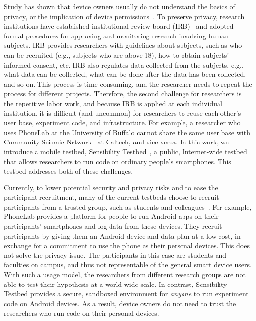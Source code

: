 Study has shown that device owners usually do not understand the 
basics of privacy, or the implication of device 
permissions~\cite{camp2015respecting}. 
To preserve privacy, research institutions have established 
institutional review board (IRB)~\cite{irb} and adopted formal 
procedures for approving and monitoring research involving 
human subjects. IRB provides researchers with guidelines about 
subjects, such as who can be recruited (e.g., subjects
who are above 18), 
how to obtain subjects' informed consent, etc. IRB also 
regulates data collected from the subjects, e.g., what data can be collected, what can 
be done after the data has been collected, and so on. This
process is time-consuming, and the researcher needs to repeat
the process for different projects. Therefore, the second challenge
for researchers is the repetitive labor work, and because IRB is
applied at each individual institution, it is difficult (and uncommon) 
for researchers to reuse each other's user base, experiment code, 
and infrastructure. For example, a researcher who uses 
PhoneLab at the University of Buffalo cannot share the same 
user base with Community Seismic Network~\cite{csn} at Caltech, 
and vice versa. In this work, we introduce a mobile testbed, 
Sensibility Testbed~\cite{sensibility, zhuang2015privacy}, a public, 
Internet-wide testbed that allows researchers to run code on ordinary
people's smartphones. This testbed addresses both of these challenges.

Currently, to lower potential security and privacy risks and to ease the 
participant recruitment, many of the current testbeds choose to 
recruit participants from a trusted group, such as students and 
colleagues~\cite{hao2013isleep, wang2012no, 
wang2013sensing}. For example, PhoneLab provides a platform for 
people to run Android apps on their participants' smartphones 
and log data from these devices. They recruit participants by 
giving them an Android device and data plan at a low cost, in 
exchange for a commitment to use the phone as their personal 
devices. This does not solve the privacy issue. 
The participants in this case are students and faculties on campus, 
and thus not representable of the general smart device users. 
With such a usage model, the researchers from different research 
groups are not able to test their hypothesis at a world-wide scale.
In contrast, Sensibility Testbed provides a secure, sandboxed 
environment for \textit{anyone} to run experiment code on Android devices. 
As a result, device owners do not need to trust the researchers 
who run code on their personal devices.
   
